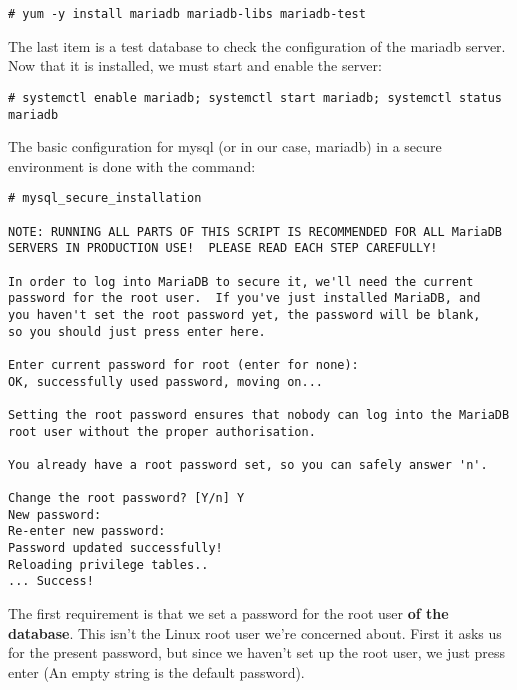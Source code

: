 \vspace{-15pt}
\begin{verbatim}
# yum -y install mariadb mariadb-libs mariadb-test
\end{verbatim}
\vspace{-10pt}	

\noindent
The last item is a test database to check the configuration of the mariadb server. Now that it is installed, we must start and enable the server:

\vspace{-15pt}
\begin{verbatim}
# systemctl enable mariadb; systemctl start mariadb; systemctl status mariadb
\end{verbatim}
\vspace{-10pt}	

\noindent
The basic configuration for mysql (or in our case, mariadb) in a secure environment is done with the command:

\vspace{-15pt}
\begin{verbatim}
# mysql_secure_installation 

NOTE: RUNNING ALL PARTS OF THIS SCRIPT IS RECOMMENDED FOR ALL MariaDB
SERVERS IN PRODUCTION USE!  PLEASE READ EACH STEP CAREFULLY!

In order to log into MariaDB to secure it, we'll need the current
password for the root user.  If you've just installed MariaDB, and
you haven't set the root password yet, the password will be blank,
so you should just press enter here.

Enter current password for root (enter for none): 
OK, successfully used password, moving on...

Setting the root password ensures that nobody can log into the MariaDB
root user without the proper authorisation.

You already have a root password set, so you can safely answer 'n'.

Change the root password? [Y/n] Y
New password: 
Re-enter new password: 
Password updated successfully!
Reloading privilege tables..
... Success!

\end{verbatim}
\vspace{-10pt}	

\noindent
The first requirement is that we set a password for the root user \textbf{of the database}. This isn't the Linux root user we're concerned about. First it asks us for the present password, but since we haven't set up the root user, we just press enter (An empty string is the default password). 

